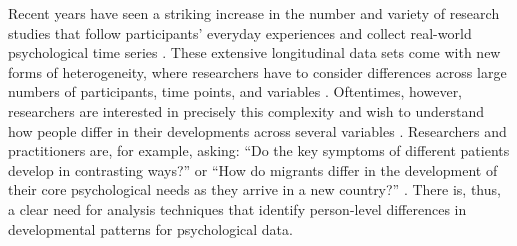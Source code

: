 \documentclass[man, 12pt, a4paper, mask, floatsintext]{apa7}
\theoremstyle{break}
\theoremstyle{plain}
\begin{document}

Recent years have seen a striking increase in the number and variety of research studies that follow participants' everyday experiences and collect real-world psychological time series \citep[e.g.,][]{hamaker2017}. These extensive longitudinal data sets come with new forms of heterogeneity, where researchers have to consider differences across large numbers of participants, time points, and variables \citep[e.g.,][]{cattell1966, wardenaar2013}. Oftentimes, however, researchers are interested in precisely this complexity and wish to understand how people differ in their developments across several variables \citep[e.g.,][]{ernst2021}. Researchers and practitioners are, for example, asking: ``Do the key symptoms of different patients develop in contrasting ways?'' \citep{Monden2015} or ``How do migrants differ in the development of their core psychological needs as they arrive in a new country?'' \citep{Kreienkamp2022d}. There is, thus, a clear need for analysis techniques that identify person-level differences in developmental patterns for psychological data.
\end{document}

